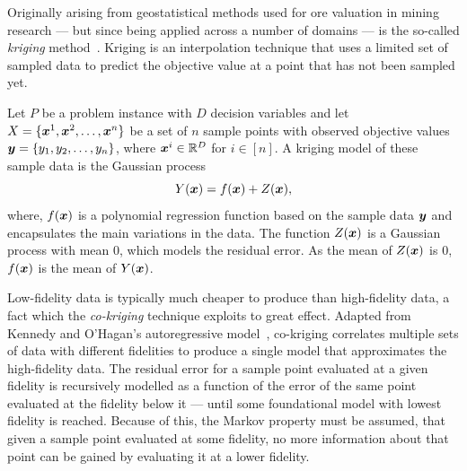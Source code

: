 \documentclass[journal]{IEEEtran}
\begin{document}
Originally arising from geostatistical methods used for ore valuation in mining research --- but since being applied across a number of domains --- is the so-called \emph{kriging} method~\cite{forrester2008engineering}. Kriging is an interpolation technique that uses a limited set of sampled data to predict the objective value at a point that has not been sampled yet.

Let $P$ be a problem instance with $D$ decision variables and let $X = \{\boldsymbol{x}^1,\boldsymbol{x}^2,\dots,\boldsymbol{x}^n\}$ be a set of $n$ sample points with observed objective values $\boldsymbol{y} = \{y_1,y_2,\dots,y_n\}$, where $\boldsymbol{x}^i \in \mathbb{R}^D$ for $i \in [n]$. A kriging model of these sample data is the Gaussian process 
\begin{equation}
Y(\boldsymbol{x}) = f(\boldsymbol{x}) + Z(\boldsymbol{x}),\label{eq:krig}
\end{equation}
where, $f(\boldsymbol{x})$ is a polynomial regression function based on the sample data $\boldsymbol{y}$ and encapsulates the main variations in the data. The function $Z(\boldsymbol{x})$ is a Gaussian process with mean $0$, which models the residual error. As the mean of $Z(\boldsymbol{x})$ is 0, $f(\boldsymbol{x})$ is the mean of $Y(\boldsymbol{x})$. 



Low-fidelity data is typically much cheaper to produce than high-fidelity data, a fact which the \emph{co-kriging} technique exploits to great effect. Adapted from Kennedy and O'Hagan's autoregressive model~\cite{kennedy2000predicting}, co-kriging correlates multiple sets of data with different fidelities to produce a single model that approximates the high-fidelity data. The residual error for a sample point evaluated at a given fidelity is recursively modelled as a function of the error of the same point evaluated at the fidelity below it --- until some foundational model with lowest fidelity is reached. Because of this, the Markov property must be assumed, that given a sample point evaluated at some fidelity, no more information about that point can be gained by evaluating it at a lower fidelity.
\end{document}
